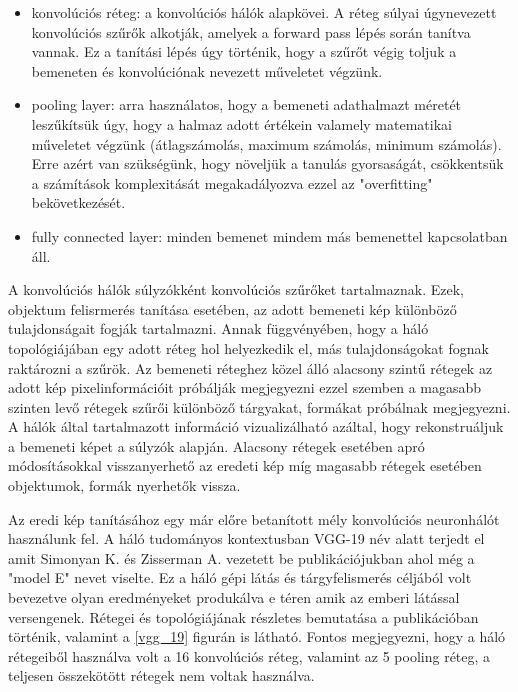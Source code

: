\documentclass[12pt, a4paper, oneside]{book}
\theoremstyle{tetel}
\begin{document}
\begin{itemize}
	\item konvolúciós réteg: a konvolúciós hálók alapkövei. A réteg súlyai úgynevezett konvolúciós szűrők alkotják, amelyek a forward pass lépés során tanítva vannak. Ez a tanítási lépés úgy történik, hogy a szűrőt végig toljuk a bemeneten és konvolúciónak nevezett műveletet végzünk. 
	\item pooling layer: arra használatos, hogy a bemeneti adathalmazt méretét leszűkítsük úgy, hogy a halmaz adott értékein valamely matematikai műveletet végzünk (átlagszámolás, maximum számolás, minimum számolás). Erre azért van szükségünk, hogy növeljük a tanulás gyorsaságát, csökkentsük a számítások komplexitását megakadályozva ezzel az "overfitting" bekövetkezését.
	\item fully connected layer: minden bemenet mindem más bemenettel kapcsolatban áll.
\end{itemize}

A konvolúciós hálók súlyzókként konvolúciós szűrőket tartalmaznak. Ezek, objektum felisrmerés tanítása esetében, az adott bemeneti kép különböző tulajdonságait fogják tartalmazni. Annak függvényében, hogy a háló topológiájában egy adott réteg hol helyezkedik el, más tulajdonságokat fognak raktározni a szűrök. Az bemeneti réteghez közel álló alacsony szintű rétegek az adott kép pixelinformációit próbálják megjegyezni ezzel szemben a magasabb szinten levő rétegek szűrői különböző tárgyakat, formákat próbálnak megjegyezni\cite{27}\cite{28}. A hálók által tartalmazott információ vizualizálható azáltal, hogy rekonstruáljuk a bemeneti képet a súlyzók alapján. Alacsony rétegek esetében apró módosításokkal visszanyerhető az eredeti kép míg magasabb rétegek esetében objektumok, formák nyerhetők vissza.

Az eredi kép tanításához egy már előre betanított mély konvolúciós neuronhálót használunk fel. A háló tudományos kontextusban VGG-19 név alatt terjedt el amit Simonyan K. és  Zisserman A. vezetett be publikációjukban\cite{29} ahol még a "model E" nevet viselte. Ez a háló gépi látás és tárgyfelismerés céljából volt bevezetve olyan eredményeket produkálva e téren amik az emberi látással versengenek. Rétegei és topológiájának részletes bemutatása a \cite{29} publikációban történik, valamint a \ref{vgg_19} figurán is látható. Fontos megjegyezni, hogy a háló rétegeiből használva volt a 16 konvolúciós réteg, valamint az 5 pooling réteg, a teljesen összekötött rétegek nem voltak használva.
\end{document}
